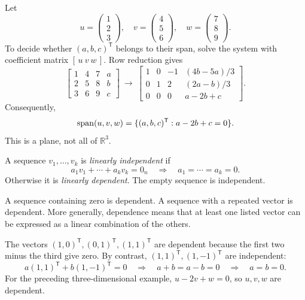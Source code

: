 \begin{example}
Let
\[
 u=\begin{pmatrix}1\\2\\3\end{pmatrix},\quad
 v=\begin{pmatrix}4\\5\\6\end{pmatrix},\quad
 w=\begin{pmatrix}7\\8\\9\end{pmatrix}.
\]
To decide whether $(a,b,c)^{\mathsf T}$ belongs to their span, solve the
system with coefficient matrix $[\,u\ v\ w\,]$. Row reduction gives
\[
 \left[\begin{array}{ccc|c}
 1&4&7&a\\2&5&8&b\\3&6&9&c
 \end{array}\right]
 \ \longrightarrow\
 \left[\begin{array}{ccc|c}
 1&0&-1&(4b-5a)/3\\
 0&1&2&(2a-b)/3\\
 0&0&0&a-2b+c
 \end{array}\right].
\]
Consequently,
\[
 \operatorname{span}(u,v,w)
 =\{(a,b,c)^{\mathsf T}:a-2b+c=0\}.
\]
This is a plane, not all of $\mathbb R^3$.
\end{example}

\begin{definition}
A sequence $v_1,\ldots,v_k$ is \emph{linearly independent} if
\[
 a_1v_1+\cdots+a_kv_k=0_n
 \quad\Longrightarrow\quad a_1=\cdots=a_k=0.
\]
Otherwise it is \emph{linearly dependent}. The empty sequence is independent.
\end{definition}

A sequence containing zero is dependent. A sequence with a repeated vector
is dependent. More generally, dependence means that at least one listed
vector can be expressed as a linear combination of the others.

\begin{example}
The vectors $(1,0)^{\mathsf T},(0,1)^{\mathsf T},(1,1)^{\mathsf T}$
are dependent because the first two minus the third give zero.
By contrast, $(1,1)^{\mathsf T},(1,-1)^{\mathsf T}$ are independent:
\[
 a(1,1)^{\mathsf T}+b(1,-1)^{\mathsf T}=0
 \quad\Longrightarrow\quad a+b=a-b=0
 \quad\Longrightarrow\quad a=b=0.
\]
For the preceding three-dimensional example, $u-2v+w=0$, so $u,v,w$
are dependent.
\end{example}

